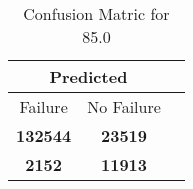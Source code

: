 \begin{table}[] 
\caption{Confusion Matric for 85.0} 
\label{Table: Prediction Accuracy-None85.0SVMEKF-ignoreReflection-Reflection} 
\centering 
\begin{tabular} 
 {@{}ccc@{}} 
\toprule 
\multicolumn{2}{c}{\textbf{Predicted}}
 \\ \midrule 
\multicolumn{1}{|c|}{Failure} & 
\multicolumn{1}{c|}{No Failure}
 \\ \midrule 
\multicolumn{1}{|c|}{\color{green}\textbf{132544}} & 
\multicolumn{1}{c|}{\color{green}\textbf{23519}}
 \\ \midrule 
\multicolumn{1}{|c|}{\color{red}\textbf{2152}} & 
\multicolumn{1}{c|}{\color{red}\textbf{11913}}
 \\ \bottomrule 
\end{tabular} 
\end{table} 

